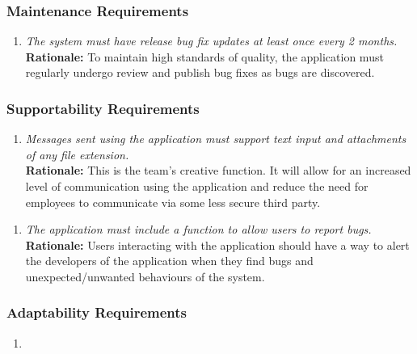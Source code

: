 \documentclass[]{article}
\begin{document}
\begin{enumerate}[{\bf BE1.}]
\subsubsection{Maintenance Requirements}
\label{ssub:maintenance_requirements}
\begin{enumerate}[{MS-M}1. ]
    \item \emph{The system must have release bug fix updates at least once every 2 months.}\\
    {\bf Rationale:} To maintain high standards of quality, the application must regularly undergo review and publish bug fixes as bugs are discovered.
\end{enumerate}


\subsubsection{Supportability Requirements}
\label{ssub:supportability_requirements}
\begin{enumerate}[{MS-S}1. ]
    \item \emph{Messages sent using the application must support text input and attachments of any file extension.}\\
    {\bf Rationale:} This is the team’s creative function. It will allow for an increased level of communication using the application and reduce the need for employees to communicate via some less secure third party.
\end{enumerate}


\begin{enumerate}[{MS-S}2. ]
    \item \emph{The application must include a function to allow users to report bugs. }\\
    {\bf Rationale:} Users interacting with the application should have a way to alert the developers of the application when they find bugs and unexpected/unwanted behaviours of the system.
\end{enumerate}


\subsubsection{Adaptability Requirements}
\label{ssub:adaptability_requirements}
\begin{enumerate}[{N/A}]
    \item
\end{enumerate}



\end{enumerate}
\end{document}
